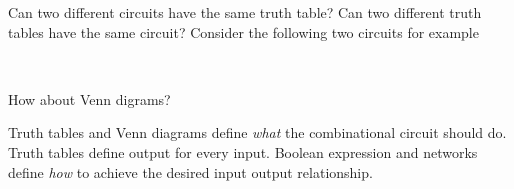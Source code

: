 \begin{prob}
Can two different circuits have the same truth table? Can two different truth tables
have the same circuit? Consider the following two circuits for example \\
\noindent{}\\[1em]

\noindent{}

How about Venn digrams?
\end{prob}
\vspace{10em}

\begin{remark}
  Truth tables and Venn diagrams define \emph{what} the combinational circuit should do. Truth tables
  define output for every input.
  Boolean expression and networks define \emph{how} to achieve the desired input
  output relationship.
\end{remark}


